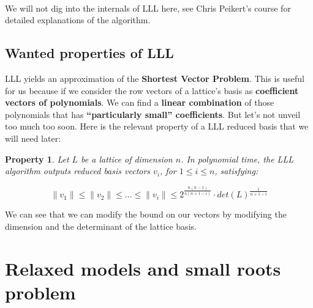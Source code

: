 \documentclass[a4paper,11pt]{article}
\newtheorem{property}{Property}
\begin{document}
\\

We will not dig into the internals of LLL here, see Chris Peikert's course\cite{chrispeikert} for detailed explanations of the algorithm.

\subsection{Wanted properties of LLL}

LLL yields an approximation of the \textbf{Shortest Vector Problem}. This is useful for us because if we consider the row vectors of a lattice's basis as \textbf{coefficient vectors of polynomials}. We can find a \textbf{linear combination} of those polynomials that has \textbf{``particularly small'' coefficients}. But let's not unveil too much too soon. Here is the relevant property of a LLL reduced basis that we will need later:

\begin{property}
Let $L$ be a lattice of dimension $n$. In polynomial time, the LLL algorithm outputs reduced basis vectors $v_i$, for $1 \leq i \leq n$, satisfying:

\[ \|v_1\| \leq \|v_2\| \leq \hdots \leq \|v_i\| \leq 2^{\frac{n(n-1)}{4(n+1-i)}} \cdot det(L)^{\frac{1}{n+1-i}} \]
\end{property}

We can see that we can modify the bound on our vectors by modifying the dimension and the determinant of the lattice basis.

\section{Relaxed models and small roots problem}\label{attacks}
\end{document}
